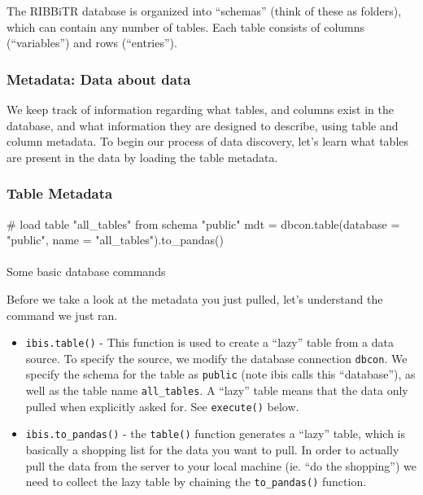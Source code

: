 \documentclass[
  letterpaper,
  DIV=11,
  numbers=noendperiod]{scrartcl}
\makeatletter
\let\oldparagraph\paragraph
\renewcommand{\paragraph}{
    \@ifstar
      \xxxParagraphStar
      \xxxParagraphNoStar
  }
\newcommand{\xxxParagraphStar}[1]{\oldparagraph*{#1}\mbox{}}
\newcommand{\xxxParagraphNoStar}[1]{\oldparagraph{#1}\mbox{}}
\newenvironment{Shaded}{\begin{snugshade}}{\end{snugshade}}
\newcommand{\CommentTok}[1]{\textcolor[rgb]{0.37,0.37,0.37}{#1}}
\newcommand{\NormalTok}[1]{\textcolor[rgb]{0.00,0.23,0.31}{#1}}
\newcommand{\OperatorTok}[1]{\textcolor[rgb]{0.37,0.37,0.37}{#1}}
\newcommand{\StringTok}[1]{\textcolor[rgb]{0.13,0.47,0.30}{#1}}
\providecommand{\tightlist}{%
  \setlength{\itemsep}{0pt}\setlength{\parskip}{0pt}}\usepackage{longtable,booktabs,array}
\makeatother
\begin{document}
The RIBBiTR database is organized into ``schemas'' (think of these as
folders), which can contain any number of tables. Each table consists of
columns (``variables'') and rows (``entries'').

\subsubsection{Metadata: Data about
data}\label{metadata-data-about-data-1}

We keep track of information regarding what tables, and columns exist in
the database, and what information they are designed to describe, using
table and column metadata. To begin our process of data discovery, let's
learn what tables are present in the data by loading the table metadata.

\subsubsection{Table Metadata}\label{table-metadata-1}

\begin{Shaded}
\begin{Highlighting}[]
\CommentTok{\# load table "all\_tables" from schema "public"}
\NormalTok{mdt }\OperatorTok{=}\NormalTok{ dbcon.table(database }\OperatorTok{=} \StringTok{"public"}\NormalTok{, name }\OperatorTok{=} \StringTok{"all\_tables"}\NormalTok{).to\_pandas()}
\end{Highlighting}
\end{Shaded}

\paragraph{Some basic database
commands}\label{some-basic-database-commands-1}

Before we take a look at the metadata you just pulled, let's understand
the command we just ran.

\begin{itemize}
\tightlist
\item
  \texttt{ibis.table()} - This function is used to create a ``lazy''
  table from a data source. To specify the source, we modify the
  database connection \texttt{dbcon}. We specify the schema for the
  table as \texttt{public} (note ibis calls this ``database''), as well
  as the table name \texttt{all\_tables}. A ``lazy'' table means that
  the data only pulled when explicitly asked for. See \texttt{execute()}
  below.
\item
  \texttt{ibis.to\_pandas()} - the \texttt{table()} function generates a
  ``lazy'' table, which is basically a shopping list for the data you
  want to pull. In order to actually pull the data from the server to
  your local machine (ie. ``do the shopping'') we need to collect the
  lazy table by chaining the \texttt{to\_pandas()} function.
\end{itemize}
\end{document}
